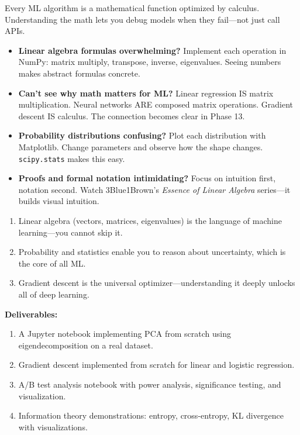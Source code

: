 \documentclass[11pt, a4paper, oneside]{report}
\begin{document}
\begin{realworldbox}
Every ML algorithm is a mathematical function optimized by calculus. Understanding the math lets you debug models when they fail---not just call APIs.
\end{realworldbox}


\begin{stuckbox}
\begin{itemize}[leftmargin=*]
\item \textbf{Linear algebra formulas overwhelming?} Implement each operation in NumPy: matrix multiply, transpose, inverse, eigenvalues. Seeing numbers makes abstract formulas concrete.
\item \textbf{Can't see why math matters for ML?} Linear regression IS matrix multiplication. Neural networks ARE composed matrix operations. Gradient descent IS calculus. The connection becomes clear in Phase 13.
\item \textbf{Probability distributions confusing?} Plot each distribution with Matplotlib. Change parameters and observe how the shape changes. \texttt{scipy.stats} makes this easy.
\item \textbf{Proofs and formal notation intimidating?} Focus on intuition first, notation second. Watch 3Blue1Brown's \emph{Essence of Linear Algebra} series---it builds visual intuition.
\end{itemize}
\end{stuckbox}


\begin{takeawaybox}
\begin{enumerate}[leftmargin=*]
\item Linear algebra (vectors, matrices, eigenvalues) is the language of machine learning---you cannot skip it.
\item Probability and statistics enable you to reason about uncertainty, which is the core of all ML.
\item Gradient descent is the universal optimizer---understanding it deeply unlocks all of deep learning.
\end{enumerate}
\end{takeawaybox}

\begin{milestonebox}
\textbf{Deliverables:}
\begin{enumerate}[leftmargin=*]
\item A Jupyter notebook implementing PCA from scratch using eigendecomposition on a real dataset.
\item Gradient descent implemented from scratch for linear and logistic regression.
\item A/B test analysis notebook with power analysis, significance testing, and visualization.
\item Information theory demonstrations: entropy, cross-entropy, KL divergence with visualizations.
\end{enumerate}
\end{milestonebox}
\end{document}

